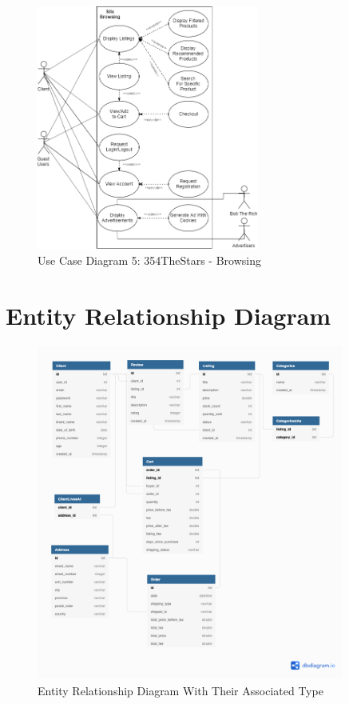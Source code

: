 \documentclass[11pt]{article}
\begin{document}
\begin{figure}[htbp]
    \centering
    \includegraphics[width=0.65\textwidth]{Diagrams/Use_Case/ucd4.png}
    \caption{Use Case Diagram 5: 354TheStars - Browsing }
    \label{fig:ucd5}
\end{figure}


\clearpage
\section{Entity Relationship Diagram}
\begin{figure}[ht!]
    \centering
    \includegraphics[width=0.9\textwidth]{Diagrams/ER/ER_Diagram_Typed.png} 
    \caption{Entity Relationship Diagram With Their Associated Type}
    \label{fig:ER_Typed}
\end{figure}
\end{document}
